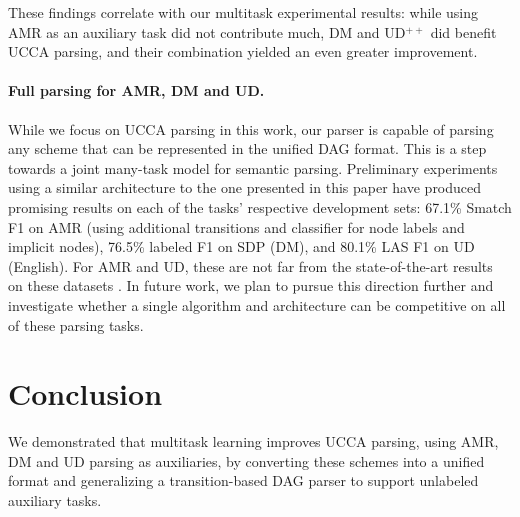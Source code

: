 \documentclass[11pt,a4paper]{article}
\begin{document}
These findings correlate with our multitask experimental results:
while using AMR as an auxiliary task did not contribute much, DM and UD$^{++}$ did benefit UCCA
parsing, and their combination yielded an even greater improvement.

\paragraph{Full parsing for AMR, DM and UD.}
While we focus on UCCA parsing in this work, our parser is capable of parsing any
scheme that can be represented in the unified DAG format.
This is a step towards a joint many-task model for semantic parsing.
Preliminary experiments using a similar architecture to the one presented in this paper have produced
promising results on each of the tasks' respective development sets:
67.1\% Smatch F1 \cite{cai2013smatch} on AMR
(using additional transitions and classifier for node labels and implicit nodes),
76.5\% labeled F1 on SDP (DM),
and 80.1\% LAS F1 on UD (English).
For AMR and UD, these are not far from the state-of-the-art results on these datasets
\cite{foland2017abstract,dozat2016deep}.
In future work, we plan to pursue this direction further and investigate whether a single
algorithm and architecture can be competitive on all of these parsing tasks.

\section{Conclusion}\label{sec:conclusion}

We demonstrated that multitask learning improves UCCA parsing,
using AMR, DM and UD parsing as auxiliaries,
by converting these schemes into a unified format
and generalizing a transition-based DAG parser to support unlabeled auxiliary tasks.




\end{document}

